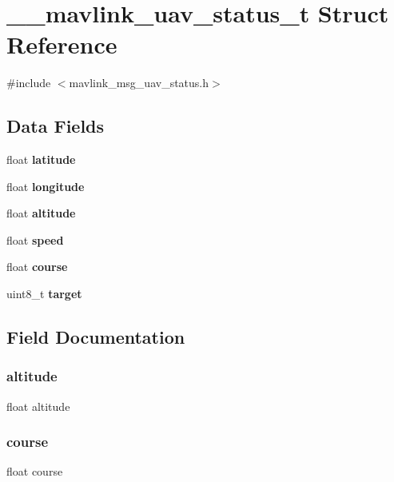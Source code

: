 \section{\+\_\+\+\_\+mavlink\+\_\+uav\+\_\+status\+\_\+t Struct Reference}
\label{struct____mavlink__uav__status__t}


{\ttfamily \#include $<$mavlink\+\_\+msg\+\_\+uav\+\_\+status.\+h$>$}

\subsection*{Data Fields}
\begin{DoxyCompactItemize}
\item 
float \textbf{ latitude}
\item 
float \textbf{ longitude}
\item 
float \textbf{ altitude}
\item 
float \textbf{ speed}
\item 
float \textbf{ course}
\item 
uint8\+\_\+t \textbf{ target}
\end{DoxyCompactItemize}


\subsection{Field Documentation}
\mbox{\label{struct____mavlink__uav__status__t_a0e13a4b4ae0cefdac2a413284239caa6}} 
\subsubsection{altitude}
{\footnotesize\ttfamily float altitude}

\mbox{\label{struct____mavlink__uav__status__t_ac6894c88aabf335922736a63b2b87b97}} 
\subsubsection{course}
{\footnotesize\ttfamily float course}

